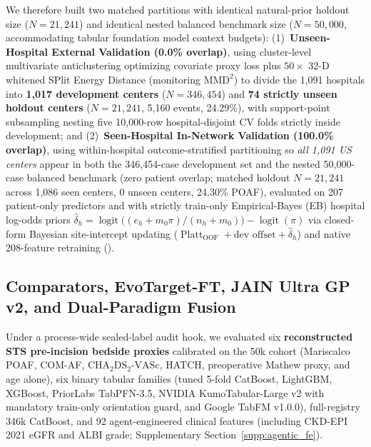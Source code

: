 We therefore built two matched partitions with identical natural-prior holdout size ($N=21{,}241$) and identical nested balanced benchmark size ($N=50{,}000$, accommodating tabular foundation model context budgets\cite{jaeger2026tabpfn35,qu2026kumotabular,kong2026tabfm}): (1)~\textbf{Unseen-Hospital External Validation (0.0\% overlap)}, using cluster-level multivariate anticlustering\cite{papenberg2021anticlustering} optimizing covariate proxy loss plus $50\times$ 32-D whitened SPlit Energy Distance\cite{joseph2022split,szekely2013energy} (monitoring $\mathrm{MMD}^2$\cite{gretton2012kernel}) to divide the 1,091 hospitals into \textbf{1,017 development centers} ($N=346{,}454$) and \textbf{74 strictly unseen holdout centers} ($N=21{,}241$, 5,160 events, 24.29\%), with support-point subsampling\cite{joseph2022split} nesting five 10,000-row hospital-disjoint CV folds strictly inside development; and (2)~\textbf{Seen-Hospital In-Network Validation (100.0\% overlap)}, using within-hospital outcome-stratified partitioning so \emph{all 1,091 US centers} appear in both the 346,454-case development set and the nested 50,000-case balanced benchmark (zero patient overlap; matched holdout $N=21{,}241$ across 1,086 seen centers, 0 unseen centers, 24.30\% POAF), evaluated on 207 patient-only predictors and with strictly train-only Empirical-Bayes (EB) hospital log-odds priors $\hat{\delta}_h = \operatorname{logit}\!\big((e_h + m_0\pi)/(n_h + m_0)\big) - \operatorname{logit}(\pi)$ via closed-form Bayesian site-intercept updating ($\operatorname{Platt}_{\mathrm{OOF}} + \text{dev offset} + \hat{\delta}_h$) and native 208-feature retraining ().

\subsection{Comparators, EvoTarget-FT, JAIN Ultra GP v2, and Dual-Paradigm Fusion}
Under a process-wide sealed-label audit hook, we evaluated six \textbf{reconstructed STS pre-incision bedside proxies} calibrated on the 50k cohort (Mariscalco POAF,\cite{mariscalco2014poaf} COM-AF,\cite{burgos2021comaf} $\mathrm{CHA_2DS_2\text{-}VASc}$,\cite{lip2010cha2ds2vasc} HATCH,\cite{devos2010hatch} preoperative Mathew proxy,\cite{mathew2004multicenter} and age alone), six binary tabular families\cite{grinsztajn2022why,erickson2025tabarena} (tuned 5-fold CatBoost,\cite{prokhorenkova2018catboost} LightGBM,\cite{ke2017lightgbm} XGBoost,\cite{chen2016xgboost} PriorLabs TabPFN-3.5,\cite{hollmann2025tabpfn,jaeger2026tabpfn35} NVIDIA KumoTabular-Large v2 with mandatory train-only orientation guard,\cite{qu2026kumotabular} and Google TabFM v1.0.0\cite{kong2026tabfm}), full-registry 346k CatBoost, and 92 agent-engineered clinical features (including CKD-EPI 2021 eGFR\cite{inker2021ckdepi} and ALBI grade;\cite{johnson2015albi} Supplementary Section~\ref{supp:agentic_fe}).

